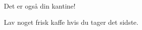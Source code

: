 \documentclass{article}
\begin{document}

\maketitle

\begin{center}
  \fontsize{72}{18}\selectfont
  Det er også din kantine!

\vspace{2cm}

  \fontsize{48}{18}\selectfont
  Lav noget frisk kaffe hvis du tager det sidste.
\end{center}

\underskriv
\end{document}
